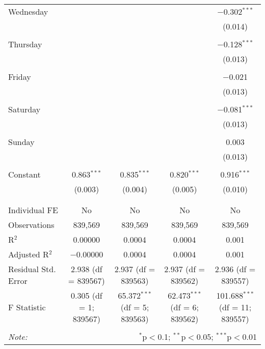 \documentclass[
]{article}
\begin{document}
\begin{table}[!htbp]
{\begin{tabular}{@{\extracolsep{5pt}}lcccc}
 Wednesday &  &  &  & $-$0.302$^{***}$ \\ 
  &  &  &  & (0.014) \\ 
  & & & & \\ 
 Thursday &  &  &  & $-$0.128$^{***}$ \\ 
  &  &  &  & (0.013) \\ 
  & & & & \\ 
 Friday &  &  &  & $-$0.021 \\ 
  &  &  &  & (0.013) \\ 
  & & & & \\ 
 Saturday &  &  &  & $-$0.081$^{***}$ \\ 
  &  &  &  & (0.013) \\ 
  & & & & \\ 
 Sunday &  &  &  & 0.003 \\ 
  &  &  &  & (0.013) \\ 
  & & & & \\ 
 Constant & 0.863$^{***}$ & 0.835$^{***}$ & 0.820$^{***}$ & 0.916$^{***}$ \\ 
  & (0.003) & (0.004) & (0.005) & (0.010) \\ 
  & & & & \\ 
\hline \\[-1.8ex] 
Individual FE & No & No & No & No \\ 
Observations & 839,569 & 839,569 & 839,569 & 839,569 \\ 
R$^{2}$ & 0.00000 & 0.0004 & 0.0004 & 0.001 \\ 
Adjusted R$^{2}$ & $-$0.00000 & 0.0004 & 0.0004 & 0.001 \\ 
Residual Std. Error & 2.938 (df = 839567) & 2.937 (df = 839563) & 2.937 (df = 839562) & 2.936 (df = 839557) \\ 
F Statistic & 0.305 (df = 1; 839567) & 65.372$^{***}$ (df = 5; 839563) & 62.473$^{***}$ (df = 6; 839562) & 101.688$^{***}$ (df = 11; 839557) \\ 
\hline 
\hline \\[-1.8ex] 
\textit{Note:}  & \multicolumn{4}{r}{$^{*}$p$<$0.1; $^{**}$p$<$0.05; $^{***}$p$<$0.01} \\ 
\end{tabular}
} 
\end{table} 
\newpage
\end{document}
